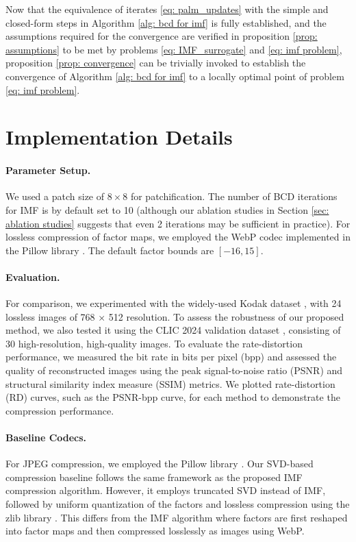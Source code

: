 Now that the equivalence of iterates \eqref{eq: palm_updates} with the simple and closed-form steps in Algorithm \ref{alg: bcd for imf} is fully established, and the assumptions required for the convergence are verified in proposition \ref{prop: assumptions} to be met by problems \eqref{eq: IMF_surrogate} and \eqref{eq: imf problem}, proposition \ref{prop: convergence} can be trivially invoked to establish the convergence of Algorithm \ref{alg: bcd for imf} to a locally optimal point of problem \eqref{eq: imf problem}.


\section{Implementation Details} \label{app: implementation details}

\paragraph{Parameter Setup.} We used a patch size of $8 \times 8$ for patchification. The number of BCD iterations for IMF is by default set to 10 (although our ablation studies in Section \ref{sec: ablation studies} suggests that even 2 iterations may be sufficient in practice). For lossless compression of factor maps, we employed the WebP codec implemented in the Pillow library \cite{clark2015pillow}. The default factor bounds are $[-16, 15]$.

\paragraph{Evaluation.} For comparison, we experimented with the widely-used Kodak dataset \cite{kodak1993}, with 24 lossless images of 768 × 512 resolution. To assess the robustness of our proposed method, we also tested it using the CLIC 2024 validation dataset \cite{clic2024}, consisting of 30 high-resolution, high-quality images. To evaluate the rate-distortion performance, we measured the bit rate in bits per pixel (bpp) and assessed the quality of reconstructed images using the peak signal-to-noise ratio (PSNR) and structural similarity index measure (SSIM) metrics. We plotted rate-distortion (RD) curves, such as the PSNR-bpp curve, for each method to demonstrate the compression performance.

\paragraph{Baseline Codecs.} For JPEG compression, we employed the Pillow library \cite{clark2015pillow}. Our SVD-based compression baseline follows the same framework as the proposed IMF compression algorithm. However, it employs truncated SVD instead of IMF, followed by uniform quantization of the factors and lossless compression using the zlib library \cite{deutsch1996zlib}. This differs from the IMF algorithm where factors are first reshaped into factor maps and then compressed losslessly as images using WebP.

